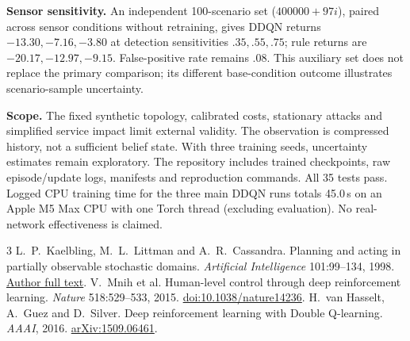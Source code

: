 \documentclass[10pt,a4paper]{article}
\begin{document}
\begin{minipage}[t]{0.482\textwidth}
\textbf{Sensor sensitivity.} An independent 100-scenario set ($400000+97i$), paired across sensor conditions without retraining, gives DDQN returns $-13.30,-7.16,-3.80$ at detection sensitivities $.35,.55,.75$; rule returns are $-20.17,-12.97,-9.15$. False-positive rate remains $.08$. This auxiliary set does not replace the primary comparison; its different base-condition outcome illustrates scenario-sample uncertainty.

\textbf{Scope.} The fixed synthetic topology, calibrated costs, stationary attacks and simplified service impact limit external validity. The observation is compressed history, not a sufficient belief state. With three training seeds, uncertainty estimates remain exploratory. The repository includes trained checkpoints, raw episode/update logs, manifests and reproduction commands. All 35 tests pass. Logged CPU training time for the three main DDQN runs totals 45.0\,s on an Apple M5 Max CPU with one Torch thread (excluding evaluation). No real-network effectiveness is claimed.
\vspace{2pt}
{\footnotesize
\begin{thebibliography}{3}
\setlength{\itemsep}{1pt}\setlength{\parskip}{0pt}
 L.~P.~Kaelbling, M.~L.~Littman and A.~R.~Cassandra. Planning and acting in partially observable stochastic domains. \emph{Artificial Intelligence} 101:99--134, 1998. \href{https://people.csail.mit.edu/lpk/papers/aij98-pomdp.pdf}{Author full text}.
 V.~Mnih et al. Human-level control through deep reinforcement learning. \emph{Nature} 518:529--533, 2015. \href{https://doi.org/10.1038/nature14236}{doi:10.1038/nature14236}.
 H.~van Hasselt, A.~Guez and D.~Silver. Deep reinforcement learning with Double Q-learning. \emph{AAAI}, 2016. \href{https://arxiv.org/abs/1509.06461}{arXiv:1509.06461}.
\end{thebibliography}}
\end{minipage}
\end{document}
